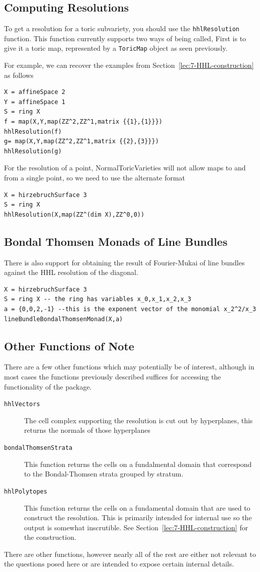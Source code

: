 \documentclass{amsart}
\begin{document}
\subsection{Computing Resolutions}

To get a resolution for a toric subvariety, you should use the \texttt{hhlResolution} function. This function currently supports two ways of being called, First is to give it a toric map, represented by a \texttt{ToricMap} object as seen previously.

For example, we can recover the examples from Section~\ref{lec:7-HHL-construction} as follows
\begin{verbatim}
X = affineSpace 2
Y = affineSpace 1
S = ring X
f = map(X,Y,map(ZZ^2,ZZ^1,matrix {{1},{1}}})
hhlResolution(f)
g= map(X,Y,map(ZZ^2,ZZ^1,matrix {{2},{3}}})
hhlResolution(g)
\end{verbatim}

For the resolution of a point, NormalToricVarieties will not allow maps to and from a single point, so we need to use the alternate format

\begin{verbatim}
X = hirzebruchSurface 3
S = ring X
hhlResolution(X,map(ZZ^(dim X),ZZ^0,0))
\end{verbatim}

\subsection{Bondal Thomsen Monads of Line Bundles}

There is also support for obtaining the result of Fourier-Mukai of line bundles against the HHL resolution of the diagonal.
\begin{verbatim}
X = hirzebruchSurface 3
S = ring X -- the ring has variables x_0,x_1,x_2,x_3
a = {0,0,2,-1} --this is the exponent vector of the monomial x_2^2/x_3
lineBundleBondalThomsenMonad(X,a)
\end{verbatim}



\subsection{Other Functions of Note}

There are a few other functions which may potentially be of interest, although in most cases the functions previously described suffices for accessing the functionality of the package.
\begin{description}
\item[\texttt{hhlVectors}] The cell complex supporting the resolution is cut out by hyperplanes, this returns the normals of those hyperplanes
\item[\texttt{bondalThomsenStrata}] This function returns the cells on a fundalmental domain that correspond to the Bondal-Thomsen strata grouped by stratum.
\item[\texttt{hhlPolytopes}] This function returns the cells on a fundamental domain that are used to construct the resolution. This is primarily intended for internal use so the output is somewhat inscrutible. See Section~\ref{lec:7-HHL-construction} for the construction.
\end{description}

There are other functions, however nearly all of the rest are either not relevant to the questions posed here or are intended to expose certain internal details.


\ifdefined\whole
\else


\end{document}
